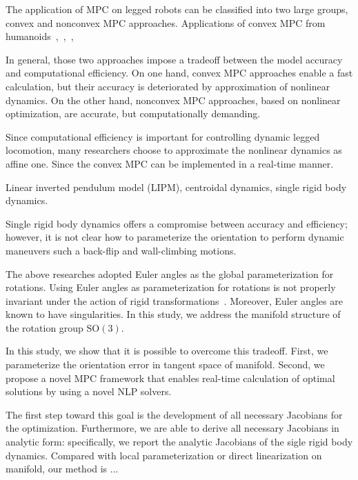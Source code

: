 \documentclass[conference]{IEEEtran}
\begin{document}
The application of MPC on legged robots can be classified into two large groups, convex and nonconvex MPC approaches. Applications of convex MPC from humanoids~\cite{wieber2006trajectory},~\cite{diedam2008online},~\cite{herdt2010online},

In general, those two approaches impose a tradeoff between the model accuracy and computational efficiency. On one hand, convex MPC approaches enable a fast calculation, but their accuracy is deteriorated by approximation of nonlinear dynamics. On the other hand, nonconvex MPC approaches, based on nonlinear optimization, are accurate, but computationally demanding. 

Since computational efficiency is important for controlling dynamic legged locomotion, many researchers choose to approximate the nonlinear dynamics as affine one. Since the convex MPC can be implemented in a real-time manner. 

Linear inverted pendulum model (LIPM), centroidal dynamics, single rigid body dynamics.

Single rigid body dynamics offers a compromise between accuracy and efficiency; however, it is not clear how to parameterize the orientation to perform dynamic maneuvers such a back-flip and wall-climbing motions. 

The above researches adopted Euler angles as the global parameterization for rotations. Using Euler angles as parameterization for rotations is not properly invariant under the action of rigid transformations~\cite{forster2016manifold}. Moreover, Euler angles are known to have singularities. In this study, we address the manifold structure of the rotation group $\mathrm{SO(3)}$. 

In this study, we show that it is possible to overcome this tradeoff. First, we parameterize the orientation error in tangent space of manifold. Second, we propose a novel MPC framework that enables real-time calculation of optimal solutions by using a novel NLP solvers. 

The first step toward this goal is the development of all necessary Jacobians for the optimization. Furthermore, we are able to derive all necessary Jacobians in analytic form: specifically, we report the analytic Jacobians of the sigle rigid body dynamics. Compared with local parameterization or direct linearization on manifold, our method is ...\begin{flushleft}
	
\end{flushleft}
\end{document}
